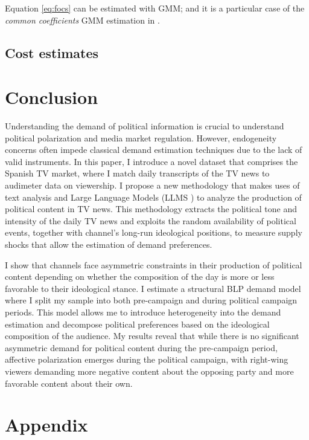\documentclass[12pt]{article}
\begin{document}
	Equation \ref{eq:focs} can be estimated with GMM; and it is a particular case of the \textit{common coefficients} GMM estimation in \cite{hayashi2000econometrics}. 
	
	
	\subsection{Cost estimates}





	
	\section{Conclusion}
	
	Understanding the demand of political information is crucial to understand political polarization and media market regulation. However, endogeneity concerns often  impede classical demand estimation techniques due to the lack of valid instruments. In this paper,  I introduce a novel dataset that comprises the Spanish TV market, where I match daily transcripts of the TV news to audimeter data on viewership. I propose a new methodology that makes uses of text analysis and Large Language Models (LLMS ) to analyze the production of political content in TV news. This methodology extracts the political tone and intensity of the daily TV news and  exploits the random availability of political events, together with channel's long-run ideological positions, to measure supply shocks that allow the estimation of  demand preferences.
	
	I show that channels face asymmetric constraints  in their production of political content depending on whether the composition of the day is more or less favorable to their ideological stance. I estimate a structural BLP demand model where I split my sample into both pre-campaign and during political campaign periods. This model allows me to introduce heterogeneity into the demand estimation and decompose political preferences based on the  ideological composition of the audience. My results reveal that while there is no significant asymmetric demand for political content during the pre-campaign period, affective polarization emerges during the political campaign, with right-wing viewers demanding more negative content about the opposing party and more favorable content about their own.
	
	
	
	
	\clearpage
	
	\section{Appendix}
	
\end{document}

